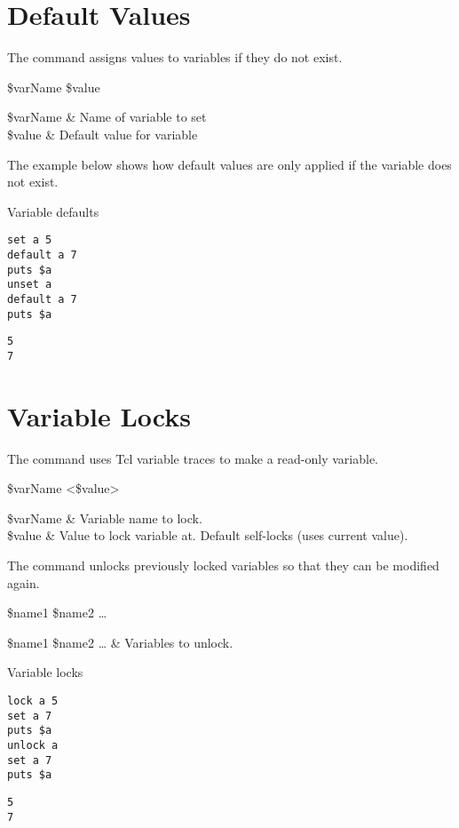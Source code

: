 \documentclass{article}
\renewcommand{\^}[1]{\textsuperscript{#1}}
\renewcommand{\_}[1]{\textsubscript{#1}}
\begin{document}
\clearpage

\section{Default Values}
The command  assigns values to variables if they do not exist.

\begin{syntax}
 \$varName \$value
\end{syntax}
\begin{args}
\$varName & Name of variable to set \\
\$value & Default value for variable
\end{args}

The example below shows how default values are only applied if the variable does not exist.

\begin{example}{Variable defaults}
\begin{lstlisting}
set a 5
default a 7
puts $a
unset a
default a 7
puts $a
\end{lstlisting}
\tcblower
\begin{lstlisting}
5
7
\end{lstlisting}
\end{example}
\clearpage
\section{Variable Locks}
The command  uses Tcl variable traces to make a read-only variable.

\begin{syntax}
 \$varName <\$value>
\end{syntax}
\begin{args}
\$varName & Variable name to lock. \\
\$value & Value to lock variable at. Default self-locks (uses current value).
\end{args}

The command  unlocks previously locked variables so that they can be modified again.

\begin{syntax}
 \$name1 \$name2 …
\end{syntax}
\begin{args}
\$name1 \$name2 … & Variables to unlock.
\end{args}

\begin{example}{Variable locks}
\begin{lstlisting}
lock a 5
set a 7
puts $a
unlock a
set a 7
puts $a
\end{lstlisting}
\tcblower
\begin{lstlisting}
5
7
\end{lstlisting}
\end{example}
\end{document}
